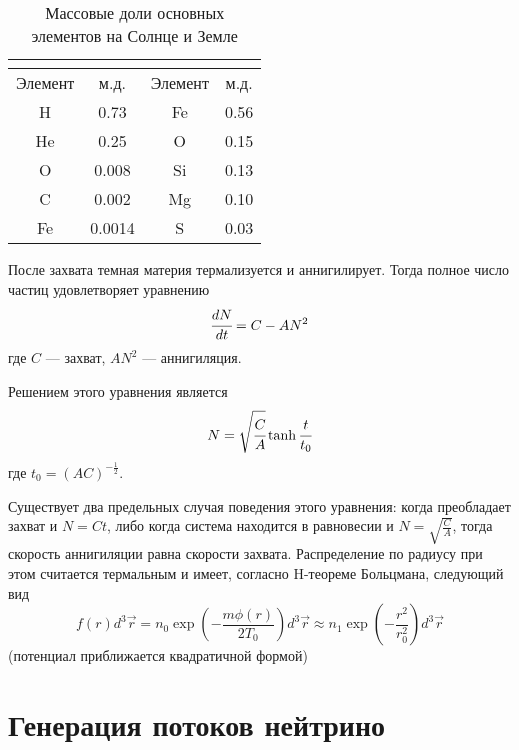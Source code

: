 \begin{table}[h!]
	\centering
	\begin{tabular}{|c|c||c|c|}
		\hline
		\multicolumn{2}{|c||}{\text{Солнце}} & \multicolumn{2}{c|}{\text{Земля}}\\
		\hline
		Элемент & м.д. & Элемент & м.д.\\ 
		\hline
		H &	0.73 & Fe & 0.56\\ 
		\hline
		He & 0.25 & O & 0.15\\
		\hline
		O &	0.008 & Si & 0.13\\
		\hline
		C &	0.002 & Mg & 0.10\\
		\hline
		Fe & 0.0014 & S & 0.03\\
		\hline
	\end{tabular}
	\caption{Массовые доли основных элементов на Солнце и Земле}
	\label{tab:mass_fractions}
\end{table}

После захвата темная материя термализуется и аннигилирует. Тогда полное число частиц удовлетворяет уравнению
\begin{equation}
	\label{eq:evolve_big}
	\cfrac{d N}{d t} = C - A N^2
\end{equation}
где $C$ --- захват, $AN^2$ --- аннигиляция.

Решением этого уравнения является
\begin{equation}
	N = \sqrt{\cfrac{C}{A}}\tanh{\cfrac{t}{t_0}}
\end{equation}
где $t_{0} = (AC)^{-\frac{1}{2}}$.

Существует два предельных случая поведения этого уравнения: когда преобладает захват и $N = Ct$, либо когда система находится в равновесии и $N = \sqrt{\frac{C}{A}}$, тогда скорость аннигиляции равна скорости захвата.
Распределение по радиусу при этом считается термальным и имеет, согласно H-теореме Больцмана, следующий вид
\begin{equation}
	\label{eq:therm_dens}
	f(r) d^3\vec{r} = n_0\exp(-\frac{m\phi(r)}{2T_0})d^3\vec{r} \approx
	 n_1\exp(-\frac{r^2}{r_0^2})d^3\vec{r}
\end{equation}
(потенциал приближается квадратичной формой)



\section{Генерация потоков нейтрино}

